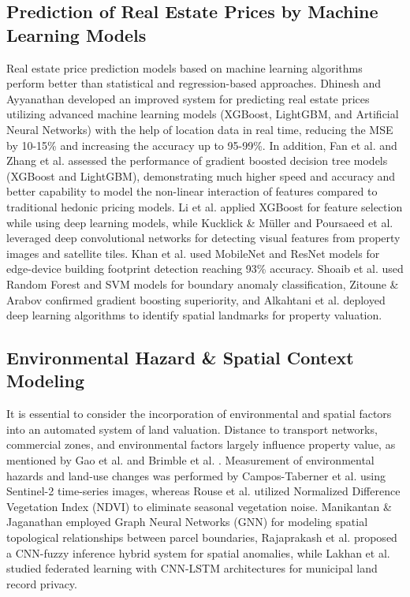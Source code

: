 \documentclass[conference]{IEEEtran}
\begin{document}
\subsection{Prediction of Real Estate Prices by Machine Learning Models}
Real estate price prediction models based on machine learning algorithms perform better than statistical and regression-based approaches. Dhinesh and Ayyanathan \cite{dhinesh2025} developed an improved system for predicting real estate prices utilizing advanced machine learning models (XGBoost, LightGBM, and Artificial Neural Networks) with the help of location data in real time, reducing the MSE by 10-15\% and increasing the accuracy up to 95-99\%. In addition, Fan et al. \cite{fan2023} and Zhang et al. \cite{zhang2024} assessed the performance of gradient boosted decision tree models (XGBoost and LightGBM), demonstrating much higher speed and accuracy and better capability to model the non-linear interaction of features compared to traditional hedonic pricing models. Li et al. \cite{li2023} applied XGBoost for feature selection while using deep learning models, while Kucklick \& Müller \cite{kucklick2023} and Poursaeed et al. \cite{poursaeed2018} leveraged deep convolutional networks for detecting visual features from property images and satellite tiles. Khan et al. \cite{khan2024} used MobileNet and ResNet models for edge-device building footprint detection reaching 93\% accuracy. Shoaib et al. \cite{shoaib2023} used Random Forest and SVM models for boundary anomaly classification, Zitoune \& Arabov \cite{zitoune2024} confirmed gradient boosting superiority, and Alkahtani et al. \cite{alkahtani2023} deployed deep learning algorithms to identify spatial landmarks for property valuation.

\subsection{Environmental Hazard \& Spatial Context Modeling}
It is essential to consider the incorporation of environmental and spatial factors into an automated system of land valuation. Distance to transport networks, commercial zones, and environmental factors largely influence property value, as mentioned by Gao et al. \cite{gao2022} and Brimble et al. \cite{brimble2020}. Measurement of environmental hazards and land-use changes was performed by Campos-Taberner et al. \cite{campos2020} using Sentinel-2 time-series images, whereas Rouse et al. \cite{rouse1974} utilized Normalized Difference Vegetation Index (NDVI) to eliminate seasonal vegetation noise. Manikantan \& Jaganathan \cite{manikantan2023} employed Graph Neural Networks (GNN) for modeling spatial topological relationships between parcel boundaries, Rajaprakash et al. \cite{rajaprakash2025} proposed a CNN-fuzzy inference hybrid system for spatial anomalies, while Lakhan et al. \cite{lakhan2023} studied federated learning with CNN-LSTM architectures for municipal land record privacy.
\end{document}
